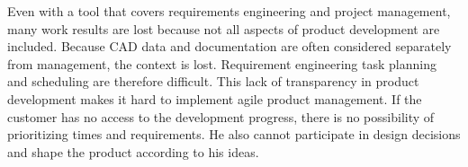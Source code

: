 
    Even with a tool that covers requirements engineering and project management, many work results are lost because not all aspects of product development are included. Because CAD data and documentation are often considered separately from management, the context is lost. 
    Requirement engineering task planning and scheduling are therefore difficult.
    This lack of transparency in product development makes it hard to implement agile product management. If the customer has no access to the development progress, there is no possibility of prioritizing times and requirements. He also cannot participate in design decisions and shape the product according to his ideas.








     





